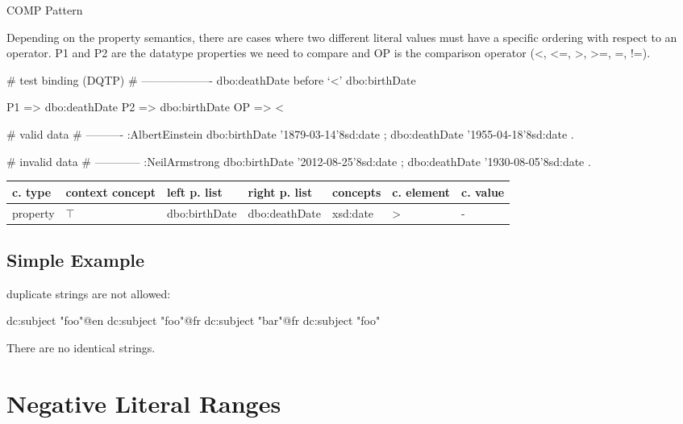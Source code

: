\documentclass{llncs}
\newenvironment{gcotable}{
  \scriptsize
  \sffamily
  \vspace{0.3cm}
  \begin{tabular}{l|l|l|l|l|l|l}
  \hline
  \textbf{c. type} & \textbf{context concept} & \textbf{left p. list} & \textbf{right p. list} & \textbf{concepts} & \textbf{c. element} & \textbf{c. value} \\
  \hline

}{
  \hline
  \end{tabular}
  \linebreak
}
\begin{document}

COMP Pattern \cite{Kontokostas2014} 

Depending on the property semantics,
there are cases where two different literal values must have
a specific ordering with respect to an operator. 
P1 and P2 are the datatype properties we need to compare and 
OP is the comparison operator (\textless, \textless=, \textgreater, \textgreater=, =, !=). 

\begin{ex}
# test binding (DQTP)
# -------------------
dbo:deathDate before ‘<’ dbo:birthDate

P1 => dbo:deathDate
P2 => dbo:birthDate
OP => <
\end{ex}

\begin{ex}
# valid data
# ----------
:AlbertEinstein
    dbo:birthDate '1879-03-14'^^xsd:date ;
    dbo:deathDate '1955-04-18'^^xsd:date .
\end{ex}

\begin{ex}
# invalid data
# ------------
:NeilArmstrong
    dbo:birthDate '2012-08-25'^^xsd:date ;
    dbo:deathDate '1930-08-05'^^xsd:date .
\end{ex}

\begin{gcotable}
property & $\top$ & dbo:birthDate & dbo:deathDate & xsd:date & \textgreater & - \\
\end{gcotable}

\subsection{Simple Example}

duplicate strings are not allowed:

\begin{ex}
dc:subject "foo"@en
dc:subject "foo"@fr
dc:subject "bar"@fr
dc:subject "foo"
\end{ex}

There are no identical strings.

\section{Negative Literal Ranges}
\end{document}
